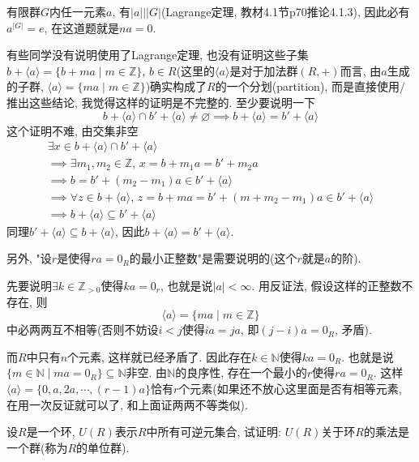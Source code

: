 \documentclass{../solutions-cn}
\begin{document}
\begin{remark}
    有限群$G$内任一元素$a$, 有$|a| \Big| |G|$(Lagrange定理, 教材4.1节p70推论4.1.3), 因此必有$a^{|G|} = e$, 在这道题就是$na = 0$.
    
    有些同学没有说明使用了Lagrange定理, 也没有证明这些子集$b + \langle a \rangle = \{b + ma \mid m \in \mathbb{Z}\},\, b \in R$(这里的$\langle a \rangle$是对于加法群$(R, +)$而言, 由$a$生成的子群, $\langle a \rangle = \{ma \mid m \in \mathbb{Z}\}$)确实构成了$R$的一个分划(partition), 而是直接使用/推出这些结论, 我觉得这样的证明是不完整的. 至少要说明一下
    \[
        b + \langle a \rangle \cap b' + \langle a \rangle \neq \varnothing \implies b + \langle a \rangle = b' + \langle a \rangle
    \]
    这个证明不难, 由交集非空
    \[
    \begin{gathered}
        \exists x \in b + \langle a \rangle \cap b' + \langle a \rangle\\
        \implies \exists m_1, m_2 \in \mathbb{Z},\, x = b + m_1a = b' + m_2a\\
        \implies b = b' + (m_2 - m_1)a \in b' + \langle a \rangle\\
        \implies \forall z \in b + \langle a \rangle,\, z = b + ma = b' + (m + m_2 - m_1)a \in b' + \langle a \rangle\\
        \implies b + \langle a \rangle \subseteq b' + \langle a \rangle
    \end{gathered}
    \]
    同理$b' + \langle a \rangle \subseteq b + \langle a \rangle$, 因此$b + \langle a \rangle = b' + \langle a \rangle$.
    
    另外, "设$r$是使得$ra = 0_R$的最小正整数"是需要说明的(这个$r$就是$a$的阶).
    
    先要说明$\exists k \in \mathbb{Z}_{>0}$使得$ka = 0_r$, 也就是说$|a| < \infty$. 用反证法, 假设这样的正整数不存在, 则
    \[
        \langle a \rangle = \{ma \mid m \in \mathbb{Z}\}
    \]
    中必两两互不相等(否则不妨设$i < j$使得$ia = ja$, 即$(j - i)a = 0_R$, 矛盾).
    
    而$R$中只有$n$个元素, 这样就已经矛盾了. 因此存在$k \in \mathbb{N}$使得$ka = 0_R$. 也就是说$\{m \in \mathbb{N} \mid ma = 0_R\} \subseteq \mathbb{N}$非空. 由$\mathbb{N}$的良序性, 存在一个最小的$r$使得$ra = 0_R$. 这样$\langle a \rangle = \{0, a, 2a, \cdots, (r - 1)a\}$恰有$r$个元素(如果还不放心这里面是否有相等元素, 在用一次反证就可以了, 和上面证两两不等类似).
\end{remark}

\begin{exercise}[习题1.3.2]
    设$R$是一个环, $U(R)$表示$R$中所有可逆元集合, 试证明: $U(R)$关于环$R$的乘法是一个群(称为$R$的单位群).
\end{exercise}
\end{document}
